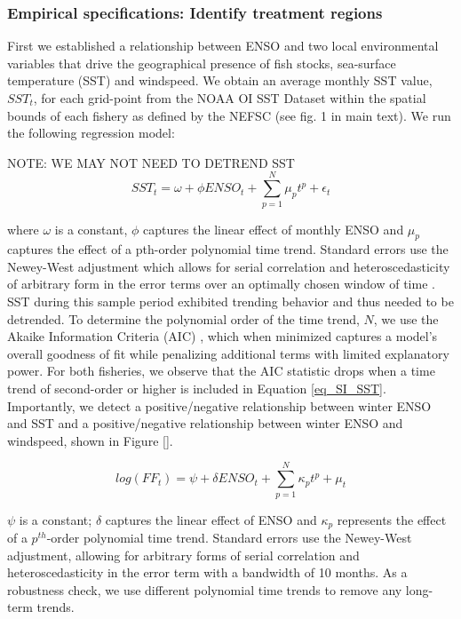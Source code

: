 \documentclass[11pt]{article}
\begin{document}
\subsubsection{Empirical specifications: Identify treatment regions}
\label{Treatment}
First we established a relationship between ENSO and two local environmental variables that drive the geographical presence of fish stocks, sea-surface temperature (SST) and windspeed. We obtain an average monthly SST value, $SST_{t}$, for each grid-point from the NOAA OI SST Dataset within the spatial bounds of each fishery as defined by the NEFSC (see fig. 1 in main text). We run the following regression model:

NOTE: WE MAY NOT NEED TO DETREND SST
\begin{equation}
\label{eq_SI_SST}
SST_{t} = \omega + \phi ENSO_{t} + \sum_{p=1}^{N} \mu_{p} t^p + \epsilon_{t} 
\end{equation}  

\noindent where $\omega$ is a constant, $\phi$ captures the linear effect of monthly ENSO and $\mu_{p}$ captures the effect of a pth-order polynomial time trend. Standard errors use the Newey-West adjustment which allows for serial correlation and heteroscedasticity of arbitrary form in the error terms over an optimally chosen window of time \cite{Newey:1987, Newey:1994}. SST during this sample period exhibited trending behavior and thus needed to be detrended. To determine the polynomial order of the time trend, $N$, we use the Akaike Information Criteria (AIC) \cite{Akaike:1974}, which when minimized captures a model's overall goodness of fit while penalizing additional terms with limited explanatory power. For both fisheries, we observe that the AIC statistic drops when a time trend of second-order or higher is included in Equation \ref{eq_SI_SST}. Importantly, we detect a positive/negative relationship between winter ENSO and SST and a positive/negative relationship between winter ENSO and windspeed, shown in Figure \ref{}.

\begin{equation}
\label{eq_T}
log(FF_{t}) = \psi + \delta ENSO_{t} + \sum_{p=1}^{N} \kappa_{p} t^p + \mu_{t}
\end{equation}

\noindent $\psi$ is a constant; $\delta$ captures the linear effect of ENSO and $\kappa_{p}$ represents the effect of a $p^{th}$-order polynomial time trend. Standard errors use the Newey-West adjustment, allowing for arbitrary forms of serial correlation and heteroscedasticity in the error term with a bandwidth of 10 months. As a robustness check, we use different polynomial time trends to remove any long-term trends.
\end{document}
